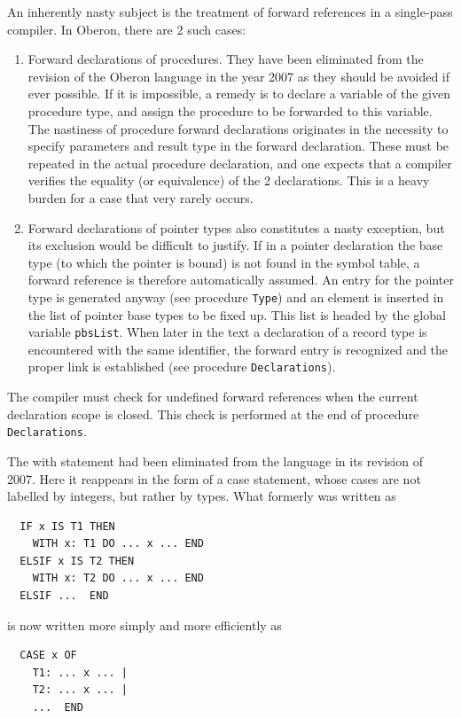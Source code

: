 An inherently nasty subject is the treatment of forward references in a single-pass compiler. In
Oberon, there are 2 such cases:
\begin{enumerate}
  \item Forward declarations of procedures. They have been eliminated from the revision of the Oberon
    language in the year 2007 as they should be avoided if ever possible. If it is impossible, a remedy
    is to declare a variable of the given procedure type, and assign the procedure to be forwarded to
    this variable. The nastiness of procedure forward declarations originates in the necessity to
    specify parameters and result type in the forward declaration. These must be repeated in the actual
    procedure declaration, and one expects that a compiler verifies the equality (or equivalence) of
    the 2 declarations. This is a heavy burden for a case that very rarely occurs.
  \item Forward declarations of pointer types also constitutes a nasty exception, but its exclusion
    would be difficult to justify. If in a pointer declaration the base type (to which the pointer is
    bound) is not found in the symbol table, a forward reference is therefore automatically assumed.
    An entry for the pointer type is generated anyway (see procedure \verb|Type|) and an element is
    inserted in the list of pointer base types to be fixed up. This list is headed by the global
    variable \verb|pbsList|. When later in the text a declaration of a record type is encountered with
    the same identifier, the forward entry is recognized and the proper link is established (see
    procedure \verb|Declarations|).
\end{enumerate}

The compiler must check for undefined forward references when the current declaration scope is closed.
This check is performed at the end of procedure \verb|Declarations|.

The with statement had been eliminated from the language in its revision of 2007. Here it reappears
in the form of a case statement, whose cases are not labelled by integers, but rather by types. What
formerly was written as
\begin{verbatim}
  IF x IS T1 THEN
    WITH x: T1 DO ... x ... END
  ELSIF x IS T2 THEN
    WITH x: T2 DO ... x ... END
  ELSIF ...  END
\end{verbatim}
is now written more simply and more efficiently as
\begin{verbatim}
  CASE x OF
    T1: ... x ... |
    T2: ... x ... |
    ...  END
\end{verbatim}

